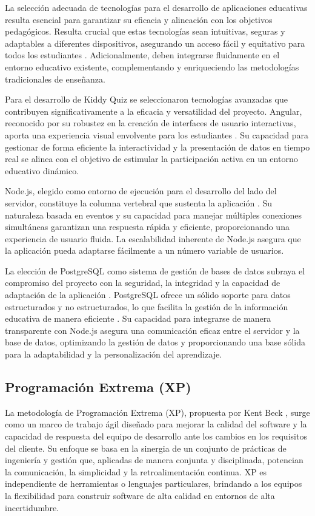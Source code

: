 La selección adecuada de tecnologías para el desarrollo de aplicaciones educativas resulta esencial para garantizar su eficacia y alineación con los objetivos pedagógicos. Resulta crucial que estas tecnologías sean intuitivas, seguras y adaptables a diferentes dispositivos, asegurando un acceso fácil y equitativo para todos los estudiantes \cite{ref48_nielsen}. Adicionalmente, deben integrarse fluidamente en el entorno educativo existente, complementando y enriqueciendo las metodologías tradicionales de enseñanza.

Para el desarrollo de Kiddy Quiz se seleccionaron tecnologías avanzadas que contribuyen significativamente a la eficacia y versatilidad del proyecto. Angular, reconocido por su robustez en la creación de interfaces de usuario interactivas, aporta una experiencia visual envolvente para los estudiantes \cite{ref49_angular}. Su capacidad para gestionar de forma eficiente la interactividad y la presentación de datos en tiempo real se alinea con el objetivo de estimular la participación activa en un entorno educativo dinámico.

Node.js, elegido como entorno de ejecución para el desarrollo del lado del servidor, constituye la columna vertebral que sustenta la aplicación \cite{ref50_nodejs}. Su naturaleza basada en eventos y su capacidad para manejar múltiples conexiones simultáneas garantizan una respuesta rápida y eficiente, proporcionando una experiencia de usuario fluida. La escalabilidad inherente de Node.js asegura que la aplicación pueda adaptarse fácilmente a un número variable de usuarios.

La elección de PostgreSQL como sistema de gestión de bases de datos subraya el compromiso del proyecto con la seguridad, la integridad y la capacidad de adaptación de la aplicación \cite{ref51_postgresql}. PostgreSQL ofrece un sólido soporte para datos estructurados y no estructurados, lo que facilita la gestión de la información educativa de manera eficiente \cite{ref52_postgres_book}. Su capacidad para integrarse de manera transparente con Node.js asegura una comunicación eficaz entre el servidor y la base de datos, optimizando la gestión de datos y proporcionando una base sólida para la adaptabilidad y la personalización del aprendizaje.

\subsection{Programación Extrema (XP)}

La metodología de Programación Extrema (XP), propuesta por Kent Beck \cite{ref53_beck}, surge como un marco de trabajo ágil diseñado para mejorar la calidad del software y la capacidad de respuesta del equipo de desarrollo ante los cambios en los requisitos del cliente. Su enfoque se basa en la sinergia de un conjunto de prácticas de ingeniería y gestión que, aplicadas de manera conjunta y disciplinada, potencian la comunicación, la simplicidad y la retroalimentación continua. XP es independiente de herramientas o lenguajes particulares, brindando a los equipos la flexibilidad para construir software de alta calidad en entornos de alta incertidumbre.

